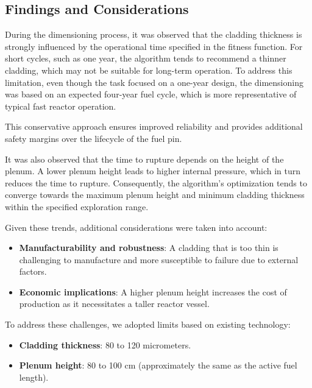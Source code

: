 \subsection{Findings and Considerations}

During the dimensioning process, it was observed that the cladding thickness is strongly influenced by the operational time specified in the fitness function. For short cycles, such as one year, the algorithm tends to recommend a thinner cladding, which may not be suitable for long-term operation. To address this limitation, even though the task focused on a one-year design, the dimensioning was based on an expected four-year fuel cycle, which is more representative of typical fast reactor operation.

This conservative approach ensures improved reliability and provides additional safety margins over the lifecycle of the fuel pin.

It was also observed that the time to rupture depends on the height of the plenum. A lower plenum height leads to higher internal pressure, which in turn reduces the time to rupture. Consequently, the algorithm’s optimization tends to converge towards the maximum plenum height and minimum cladding thickness within the specified exploration range.

Given these trends, additional considerations were taken into account:
\begin{itemize}
    \item \textbf{Manufacturability and robustness}: A cladding that is too thin is challenging to manufacture and more susceptible to failure due to external factors.
    \item \textbf{Economic implications}: A higher plenum height increases the cost of production as it necessitates a taller reactor vessel.
\end{itemize}

To address these challenges, we adopted limits based on existing technology:
\begin{itemize}
    \item \textbf{Cladding thickness}: 80 to 120 micrometers.
    \item \textbf{Plenum height}: 80 to 100 cm (approximately the same as the active fuel length).
\end{itemize}
